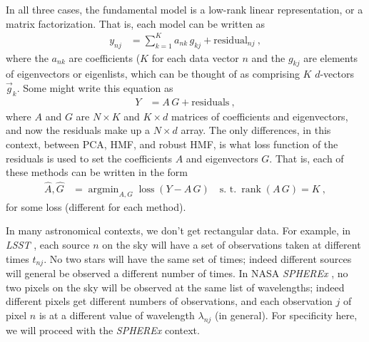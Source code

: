 \documentclass{article}
\DeclareMathOperator*{\argmin}{argmin}
\DeclareMathOperator{\loss}{loss}
\DeclareMathOperator{\rank}{rank}
\begin{document}
In all three cases, the fundamental model is a low-rank linear representation, or a matrix factorization.
That is, each model can be written as
\begin{align}
    y_{nj} &= \sum_{k=1}^K a_{nk}\,g_{kj} + \text{residual}_{nj} ~,
\end{align}
where the $a_{nk}$ are coefficients ($K$ for each data vector $n$ and the $g_{kj}$ are elements of eigenvectors or eigenlists, which can be thought of as comprising $K$ $d$-vectors $\vec{g}_k$.
Some might write this equation as
\begin{align}
    Y &= A\,G + \text{residuals} ~,
\end{align}
where $A$ and $G$ are $N\times K$ and $K\times d$ matrices of coefficients and eigenvectors,
and now the residuals make up a $N\times d$ array.
The only differences, in this context, between PCA, HMF, and robust HMF, is what loss function of the residuals is used to set the coefficients $A$ and eigenvectors $G$.
That is, each of these methods can be written in the form
\begin{align}
    \hat{A}, \hat{G} &= \argmin_{A, G} \loss(Y - A\,G) \quad\text{s. t.}~\rank(A\,G) = K ~,
\end{align}
for some loss (different for each method).

In many astronomical contexts, we don't get rectangular data.
For example, in \textsl{LSST} \cite{lsst}, each source $n$ on the sky will have a set of observations taken at different times $t_{nj}$.
No two stars will have the same set of times; indeed different sources will general be observed a different number of times.
In NASA \textsl{SPHEREx} \cite{spherex}, no two pixels on the sky will be observed at the same list of wavelengths; indeed different pixels get different numbers of observations, and each observation $j$ of pixel $n$ is at a different value of wavelength $\lambda_{nj}$ (in general).
For specificity here, we will proceed with the \textsl{SPHEREx} context.
\end{document}
